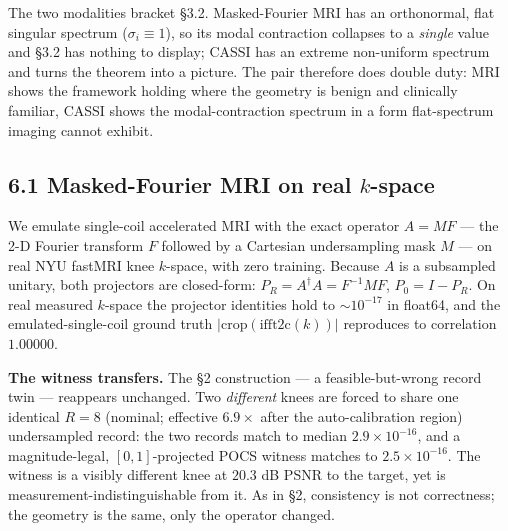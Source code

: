 \documentclass[11pt]{article}
\begin{document}
The two modalities bracket §3.2. Masked-Fourier MRI has an orthonormal, flat singular spectrum ($\sigma_i \equiv 1$), so its modal contraction collapses to a \textit{single} value and §3.2 has nothing to display; CASSI has an extreme non-uniform spectrum and turns the theorem into a picture. The pair therefore does double duty: MRI shows the framework holding where the geometry is benign and clinically familiar, CASSI shows the modal-contraction spectrum in a form flat-spectrum imaging cannot exhibit.

\subsection*{6.1 Masked-Fourier MRI on real $k$-space}

We emulate single-coil accelerated MRI with the exact operator $A = MF$ --- the 2-D Fourier transform $F$ followed by a Cartesian undersampling mask $M$ --- on real NYU fastMRI knee $k$-space, with zero training. Because $A$ is a subsampled unitary, both projectors are closed-form: $P_R = A^\dagger A = F^{-1} M F$, $P_0 = I - P_R$. On real measured $k$-space the projector identities hold to ${\sim}10^{-17}$ in float64, and the emulated-single-coil ground truth $|\mathrm{crop}(\mathrm{ifft2c}(k))|$ reproduces to correlation $1.00000$.

\textbf{The witness transfers.} The §2 construction --- a feasible-but-wrong record twin --- reappears unchanged. Two \textit{different} knees are forced to share one identical $R{=}8$ (nominal; effective $6.9\times$ after the auto-calibration region) undersampled record: the two records match to median $2.9\times10^{-16}$, and a magnitude-legal, $[0,1]$-projected POCS witness matches to $2.5\times10^{-16}$. The witness is a visibly different knee at $20.3$ dB PSNR to the target, yet is measurement-indistinguishable from it. As in §2, consistency is not correctness; the geometry is the same, only the operator changed.
\end{document}
